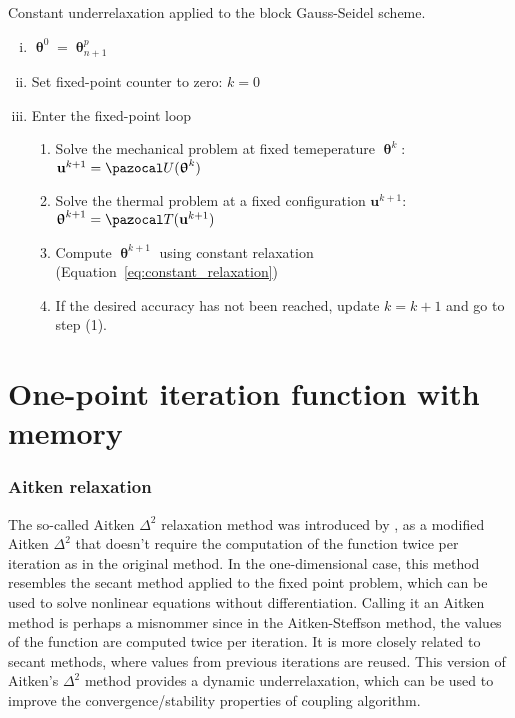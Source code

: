 \begin{framedbox}[htb]
  \caption{Constant underrelaxation applied to the block Gauss-Seidel scheme.}
  \label{box:constant_underrelaxation}
  \begin{center}
    \begin{minipage}{0.9\textwidth}
    \begin{enumerate}[(i)]
    \item \(\bm\uptheta^0 = \bm\uptheta_{n+1}^p\)
    \item Set fixed-point counter to zero: \(k=0\)
    \item Enter the fixed-point loop
    \begin{enumerate}[(1)]
      \item Solve the mechanical problem at fixed temeperature \(\bm \uptheta^k\): \(\mathbf u^{k+1} = \pazocal U(\bm \uptheta^k)\)
      \item Solve the thermal problem at a fixed configuration \(\mathbf u^{k+1}\): \(\bm \uptheta^{k+1} = \pazocal T(\mathbf u^{k+1})\)
      \item Compute \(\bm \uptheta^{k+1}\) using constant relaxation (Equation~\eqref{eq:constant_relaxation})
      \item If the desired accuracy has not been reached, update \(k=k+1\) and go to step (1).
    \end{enumerate}
    \end{enumerate}
    \end{minipage}
  \end{center}
\end{framedbox}

\section{One-point iteration function with memory}


\subsubsection{Aitken relaxation}

\citep{irons_version_1969, kuttler_fixed-point_2008, joosten_analysis_2009, kuttler_vector_2009, erbts_partitioned_2015, wendt_partitioned_2015}


The so-called Aitken \(\Delta^2\) relaxation method was introduced by \cite{irons_version_1969}, as a modified Aitken \(\Delta^2\) that doesn't require the computation of the function twice per iteration as in the original method.
In the one-dimensional case, this method resembles the secant method applied to the fixed point problem, which can be used to solve nonlinear equations without differentiation.
Calling it an Aitken method is perhaps a misnommer since in the Aitken-Steffson method, the values of the function are computed twice per iteration.
It is more closely related to secant methods, where values from previous iterations are reused.
This version of Aitken's \(\Delta^2\) method provides a dynamic underrelaxation, which can be used to improve the convergence/stability properties of coupling algorithm.

